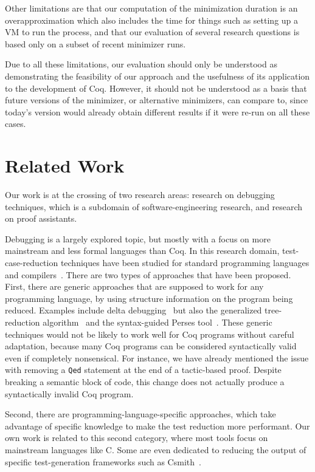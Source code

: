 \documentclass[a4paper,USenglish,cleveref,autoref,thm-restate]{lipics-v2021}
\begin{document}
Other limitations are that our computation of the minimization duration is an overapproximation which also includes the time for things such as setting up a VM to run the process, and that our evaluation of several research questions is based only on a subset of recent minimizer runs.

Due to all these limitations, our evaluation should only be understood as demonstrating the feasibility of our approach and the usefulness of its application to the development of Coq. However, it should not be understood as a basis that future versions of the minimizer, or alternative minimizers, can compare to, since today's version would already obtain different results if it were re-run on all these cases.

\section{Related Work}\label{sec:related-work}

Our work is at the crossing of two research areas: research on debugging techniques, which is a subdomain of software-engineering research, and research on proof assistants.

Debugging is a largely explored topic, but mostly with a focus on more mainstream and less formal languages than Coq.
In this research domain, test-case-reduction techniques have been studied for standard programming languages and compilers~\cite{chen_survey_compiler_testing}. There are two types of approaches that have been proposed. First, there are generic approaches that are supposed to work for any programming language, by using structure information on the program being reduced. Examples include delta debugging~\cite{Zeller2002} but also the generalized tree-reduction algorithm~\cite{herfert2017automatically} and the syntax-guided Perses tool~\cite{herfert2017automatically}. These generic techniques would not be likely to work well for Coq programs without careful adaptation, because many Coq programs can be considered syntactically valid even if completely nonsensical. For instance, we have already mentioned the issue with removing a \texttt{Qed} statement at the end of a tactic-based proof. Despite breaking a semantic block of code, this change does not actually produce a syntactically invalid Coq program.

Second, there are programming-language-specific approaches, which take advantage of specific knowledge to make the test reduction more performant. Our own work is related to this second category, where most tools focus on mainstream languages like C. Some are even dedicated to reducing the output of specific test-generation frameworks such as Csmith~\cite{regehr2012test}.
\end{document}
